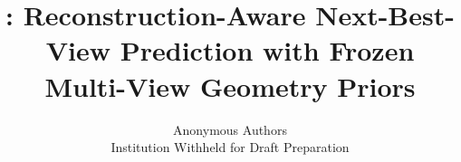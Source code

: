 \documentclass[10pt,twocolumn,letterpaper]{article}
\title{\method: Reconstruction-Aware Next-Best-View Prediction with Frozen Multi-View Geometry Priors}
\author{
Anonymous Authors\\
Institution Withheld for Draft Preparation
}
\begin{document}
\maketitle









{
    \small
    
    
}

\clearpage
\appendix

\end{document}
